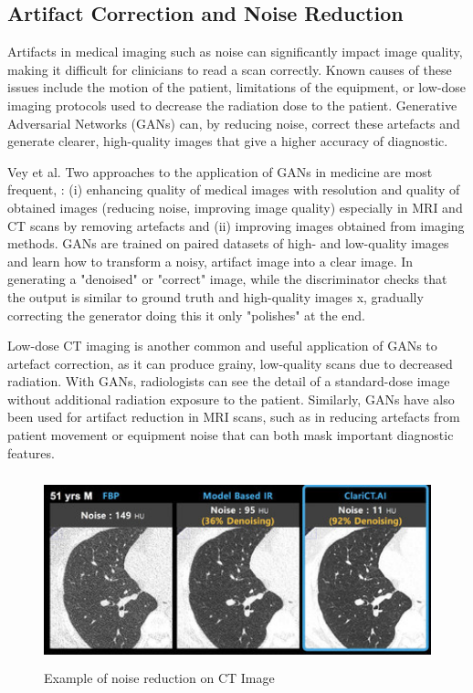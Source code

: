 \documentclass[12pt]{article}
\begin{document}
\subsection{Artifact Correction and Noise Reduction}

Artifacts in medical imaging such as noise can significantly impact image quality, making it difficult for clinicians to read a scan correctly. Known causes of these issues include the motion of the patient, limitations of the equipment, or low-dose imaging protocols used to decrease the radiation dose to the patient. Generative Adversarial Networks (GANs) can, by reducing noise, correct these artefacts and generate clearer, high-quality images that give a higher accuracy of diagnostic.

Vey et al. Two approaches to the application of GANs in medicine are most frequent, \cite{Vey2019}: (i) enhancing quality of medical images with resolution and quality of obtained images (reducing noise, improving image quality) especially in MRI and CT scans by removing artefacts and (ii) improving images obtained from imaging methods. GANs are trained on paired datasets of high- and low-quality images and learn how to transform a noisy, artifact image into a clear image. In generating a "denoised" or "correct" image, while the discriminator checks that the output is similar to ground truth and high-quality images x, gradually correcting the generator doing this it only "polishes" at the end.

Low-dose CT imaging is another common and useful application of GANs to artefact correction, as it can produce grainy, low-quality scans due to decreased radiation. With GANs, radiologists can see the detail of a standard-dose image without additional radiation exposure to the patient. Similarly, GANs have also been used for artifact reduction in MRI scans, such as in reducing artefacts from patient movement or equipment noise that can both mask important diagnostic features.

\begin{figure}[h]
\includegraphics[height=5.5cm]{exemplificationOfNoise.jpg}
\centering
\caption{Example of noise reduction on CT Image \cite{ClariPi2021}}
\end{figure}
\end{document}
